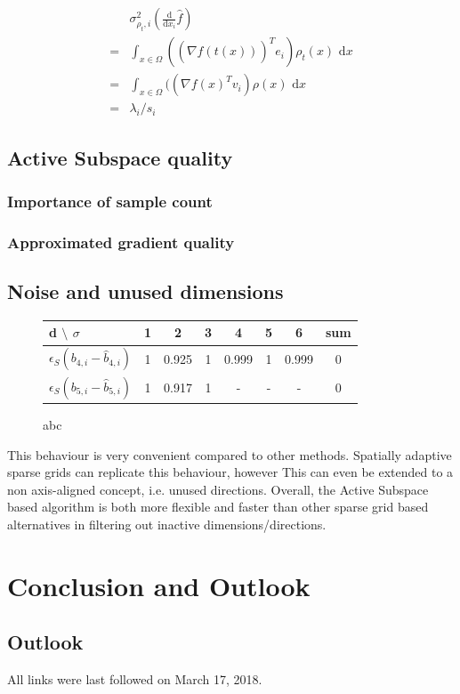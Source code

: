 \documentclass[
  a4paper,  %
  twoside,  %
  bibliography=totoc,
  headsepline,
  cleardoublepage=empty,
  parskip=half,
  draft=false
]{scrbook}
\begin{document}
\begin{equation}
\begin{split}
&\sigma^2_{\rho_t,i}(\frac{\text{d}}{\text{d}x_i} \hat{f})\\
=&\int_{x \in \Omega} ((\nabla \hat{f}(t(x)))^T e_i) \rho_t(x) \text{ d}x\\
=&\int_{x \in \Omega} ((\nabla f(x)^T v_i) \rho(x) \text{ d}x\\
=&\lambda_i / s_i
\end{split}
\end{equation}

\section{Active Subspace quality}


\subsection{Importance of sample count}


\subsection{Approximated gradient quality}


\section{Noise and unused dimensions}

\begin{figure}[H]
\centering
\begin{tabular}{ l | c | c | c | c | c | c | c |}
d $\setminus$ $\sigma$ & 1 & 2 & 3 & 4 & 5 & 6 & sum\\
\hline
$\epsilon_S(b_{4,i} - \hat{b}_{4,i})$ & 1 & 0.925& 1 & 0.999 & 1 & 0.999 & 0\\
$\epsilon_S(b_{5,i} - \hat{b}_{5,i})$ & 1 & 0.917 &1 & - & - & - & 0\\
\end{tabular}
\caption{abc}
\end{figure}

This behaviour is very convenient compared to other methods.
Spatially adaptive sparse grids can replicate this behaviour, however
This can even be extended to a non axis-aligned concept, i.e. unused directions.
Overall, the Active Subspace based algorithm is both more flexible and faster than other sparse grid based alternatives in filtering out inactive dimensions/directions.

\chapter{Conclusion and Outlook}
\label{chap:zusfas}

\section*{Outlook}

\printbibliography

All links were last followed on March 17, 2018.

\appendix

\pagestyle{empty}
\renewcommand*{\chapterpagestyle}{empty}
\Versicherung
\end{document}
